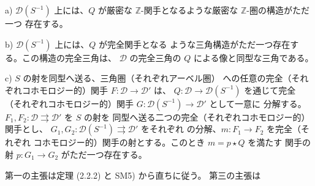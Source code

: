 \par\noindent a) $\mathcal D(S^{-1})$ 上には、$Q$ が厳密な
$\mathbb Z$-関手となるような厳密な $\mathbb Z$-圏の構造がただ一つ
存在する。

\par\noindent b) $\mathcal D(S^{-1})$ 上には、$Q$ が完全関手となる
ような三角構造がただ一つ存在する。この構造の完全三角は、
$\mathcal D$ の完全三角の $Q$ による像と同型な三角である。

\par\noindent c) $S$ の射を同型へ送る、三角圏（それぞれアーベル圏）
への任意の完全（それぞれコホモロジー的）関手
$F\colon\mathcal D\longrightarrow\mathcal D'$ は、
$Q\colon\mathcal D\longrightarrow\mathcal D(S^{-1})$ を通じて完全
（それぞれコホモロジー的）関手
$G\colon\mathcal D(S^{-1})\longrightarrow\mathcal D'$ として一意に
分解する。
%
$F_1,F_2\colon\mathcal D\rightrightarrows\mathcal D'$ を $S$ の射を
同型へ送る二つの完全（それぞれコホモロジー的）関手とし、
$G_1,G_2\colon\mathcal D(S^{-1})\rightrightarrows\mathcal D'$ をそれぞれ
の分解、$m\colon F_1\longrightarrow F_2$ を完全（それぞれ
コホモロジー的）関手の射とする。このとき $m=p\star Q$ を満たす
関手の射 $p\colon G_1\longrightarrow G_2$ がただ一つ存在する。
\endgroup

\par\noindent 第一の主張は定理 (2.2.2) と SM5) から直ちに従う。
%
第三の主張は

\endgroup
